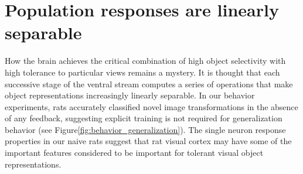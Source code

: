 \section{Population responses are linearly separable}
How the brain achieves the critical combination of high object selectivity with high tolerance to particular views remains a mystery. It is thought that each successive stage of the ventral stream computes a series of operations that make object representations increasingly linearly separable. In our behavior experiments, rats accurately classified novel image transformations in the absence of any feedback, suggesting explicit training is not required for generalization behavior (see Figure\ref{fig:behavior_generalization}). The single neuron response properties in our naive rats suggest that rat visual cortex may have some of the important features considered to be important for tolerant visual object representations.


